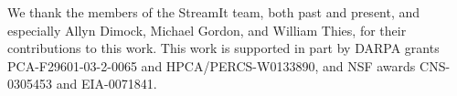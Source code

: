 \documentclass{sigplanconf}
\begin{document}

\pagestyle{plain}
%




%
%





\acks  
We thank the members of the StreamIt team, both past
and present, and especially Allyn Dimock, Michael Gordon, and William
Thies, for their contributions to this work. This work is supported in
part by DARPA grants PCA-F29601-03-2-0065 and HPCA/PERCS-W0133890, and
NSF awards CNS-0305453 and EIA-0071841.


%
%

\end{document}
